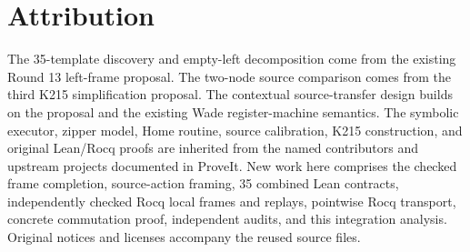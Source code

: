 \documentclass[11pt,letterpaper]{article}
\theoremstyle{definition}
\newcommand{\code}[1]{\texttt{\detokenize{#1}}}
\begin{document}
\section*{Attribution}

The 35-template discovery and empty-left decomposition come from the existing
Round 13 left-frame proposal. The two-node source comparison comes from
the third K215 simplification proposal. The contextual source-transfer design builds on
the \code{common-macros} proposal and the existing Wade register-machine
semantics. The symbolic executor, zipper model, Home routine, source
calibration, K215 construction, and original Lean/Rocq proofs are inherited
from the named contributors and upstream projects documented in ProveIt.
New work here comprises the checked frame completion, source-action framing,
35 combined Lean contracts, independently checked Rocq local frames and
replays, pointwise Rocq transport, concrete commutation proof,
independent audits, and this integration analysis. Original notices and
licenses accompany the reused source files.
\end{document}
